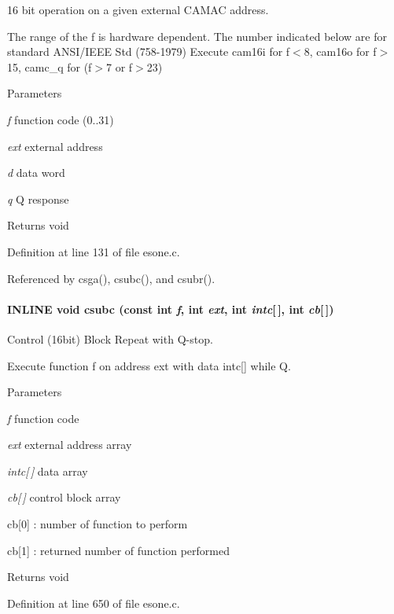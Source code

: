 16 bit operation on a given external CAMAC address.

The range of the f is hardware dependent. The number indicated below are for standard ANSI/IEEE Std (758-\/1979) Execute cam16i for f$<$8, cam16o for f$>$15, camc\_\-q for (f$>$7 or f$>$23)


\begin{DoxyParams}{Parameters}
\item[{\em f}]function code (0..31) \item[{\em ext}]external address \item[{\em d}]data word \item[{\em q}]Q response \end{DoxyParams}
\begin{DoxyReturn}{Returns}
void 
\end{DoxyReturn}


Definition at line 131 of file esone.c.

Referenced by csga(), csubc(), and csubr().
\paragraph[{csubc}]{\setlength{\rightskip}{0pt plus 5cm}INLINE void csubc (const int {\em f}, \/  int {\em ext}, \/  int {\em intc}\mbox{[}$\,$\mbox{]}, \/  int {\em cb}\mbox{[}$\,$\mbox{]})}\hfill\label{esone_8c_a5e02aa0b87d8986d123f040088c7f789}
Control (16bit) Block Repeat with Q-\/stop.

Execute function f on address ext with data intc\mbox{[}\mbox{]} while Q.


\begin{DoxyParams}{Parameters}
\item[{\em f}]function code \item[{\em ext}]external address array \item[{\em intc\mbox{[}$\,$\mbox{]}}]data array \item[{\em cb\mbox{[}$\,$\mbox{]}}]control block array \par
 cb\mbox{[}0\mbox{]} : number of function to perform \par
 cb\mbox{[}1\mbox{]} : returned number of function performed \end{DoxyParams}
\begin{DoxyReturn}{Returns}
void 
\end{DoxyReturn}


Definition at line 650 of file esone.c.
